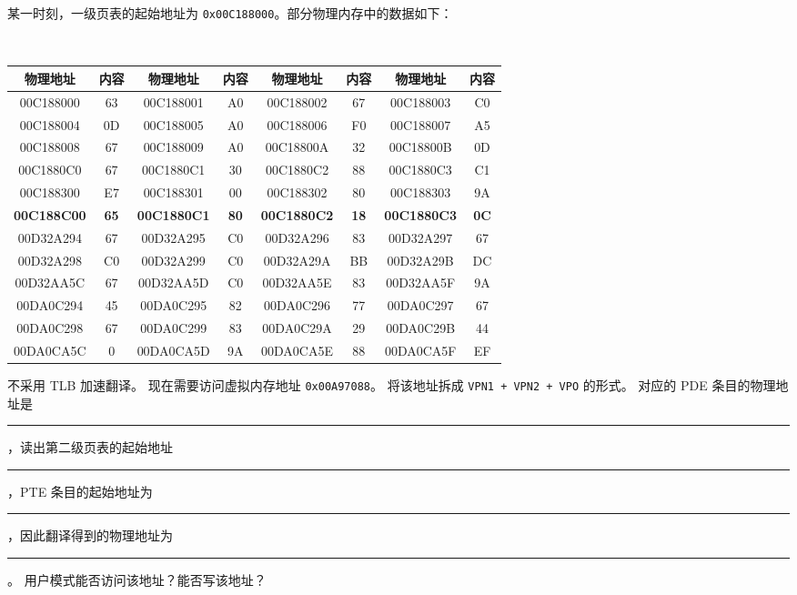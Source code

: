 \begin{problems}
        某一时刻，一级页表的起始地址为 \verb|0x00C188000|。部分物理内存中的数据如下：
        \begin{table}[H]
            \tt
            \centering
            \begin{tabular}{|c|c|c|c|c|c|c|c|}
                \hline
                物理地址 & 内容 & 物理地址 & 内容 & 物理地址 & 内容 & 物理地址 & 内容 \\ \hline
                00C188000 & 63 & 00C188001 & A0 & 00C188002 & 67 & 00C188003 & C0 \\ \hline
                00C188004 & 0D & 00C188005 & A0 & 00C188006 & F0 & 00C188007 & A5 \\ \hline
                00C188008 & 67 & 00C188009 & A0 & 00C18800A & 32 & 00C18800B & 0D \\ \hline
                00C1880C0 & 67 & 00C1880C1 & 30 & 00C1880C2 & 88 & 00C1880C3 & C1 \\ \hline
                00C188300 & E7 & 00C188301 & 00 & 00C188302 & 80 & 00C188303 & 9A \\ \hline
                \textbf{00C188C00} & \textbf{65} & \textbf{00C1880C1} & \textbf{80} & \textbf{00C1880C2} & \textbf{18} & \textbf{00C1880C3} & \textbf{0C} \\ \hline
                00D32A294 & 67 & 00D32A295 & C0 & 00D32A296 & 83 & 00D32A297 & 67 \\ \hline
                00D32A298 & C0 & 00D32A299 & C0 & 00D32A29A & BB & 00D32A29B & DC \\ \hline
                00D32AA5C & 67 & 00D32AA5D & C0 & 00D32AA5E & 83 & 00D32AA5F & 9A \\ \hline
                00DA0C294 & 45 & 00DA0C295 & 82 & 00DA0C296 & 77 & 00DA0C297 & 67 \\ \hline
                00DA0C298 & 67 & 00DA0C299 & 83 & 00DA0C29A & 29 & 00DA0C29B & 44 \\ \hline
                00DA0CA5C & 0 & 00DA0CA5D & 9A & 00DA0CA5E & 88 & 00DA0CA5F & EF \\ \hline
            \end{tabular}
        \end{table}
        不采用 TLB 加速翻译。
        \qn 现在需要访问虚拟内存地址 \verb|0x00A97088|。
            \subqn 将该地址拆成 \verb|VPN1 + VPN2 + VPO| 的形式。
            \subqn 对应的 PDE 条目的物理地址是 \rule{2.5cm}{0.25mm}，读出第二级页表的起始地址 \rule{2.5cm}{0.25mm}，PTE 条目的起始地址为 \rule{2.5cm}{0.25mm}，因此翻译得到的物理地址为 \rule{2.5cm}{0.25mm}。
            \subqn 用户模式能否访问该地址？能否写该地址？

\end{problems}
